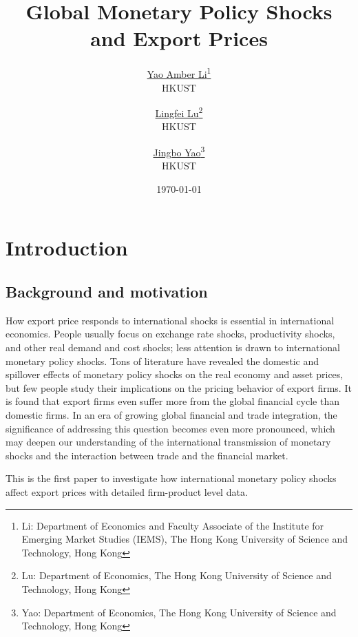 \documentclass[12pt]{article}
\begin{document}
\title{\Large \textbf{Global Monetary Policy Shocks and Export Prices}}


\author{\large \href{http://yaoli.people.ust.hk/}{Yao Amber Li}\thanks{Li: Department of Economics and Faculty Associate of the Institute for Emerging Market Studies (IEMS), The Hong Kong University of Science and Technology, Hong Kong}\\ \large{HKUST}
\medskip
\and \href{}{Lingfei Lu}\thanks{Lu: Department of Economics, The Hong Kong University of Science and Technology, Hong Kong } \\ \large{HKUST}
\medskip
\and \href{}{Jingbo Yao}\thanks{Yao: Department of Economics, The Hong Kong University of Science and Technology, Hong Kong} \\ \large{HKUST}
}
\date{\today}

\maketitle

\tableofcontents
\newpage

\section{Introduction}



\subsection{Background and motivation}

How export price responds to international shocks is essential in international economics. People usually focus on exchange rate shocks, productivity shocks, and other real demand and cost shocks; less attention is drawn to international monetary policy shocks. Tons of literature have revealed the domestic and spillover effects of monetary policy shocks on the real economy and asset prices, but few people study their implications on the pricing behavior of export firms. It is found that export firms even suffer more from the global financial cycle than domestic firms. In an era of growing global financial and trade integration, the significance of addressing this question becomes even more pronounced, which may deepen our understanding of the international transmission of monetary shocks and the interaction between trade and the financial market.

This is the first paper to investigate how international monetary policy shocks affect export prices with detailed firm-product level data. 
\end{document}
